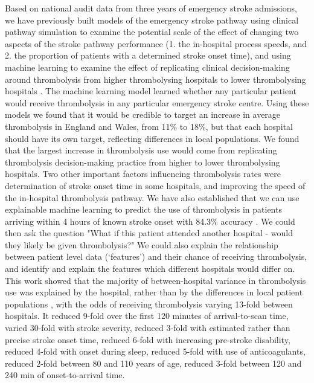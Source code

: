 Based on national audit data from three years of emergency stroke admissions, we have previously built models of the emergency stroke pathway using clinical pathway simulation to examine the potential scale of the effect of changing two aspects of the stroke pathway performance (1. the in-hospital process speeds, and 2. the proportion of patients with a determined stroke onset time), and using machine learning to examine the effect of replicating clinical decision-making around thrombolysis from higher thrombolysing hospitals to lower thrombolysing hospitals \cite{allen_using_2022, allen_use_2022, pearn_what_2023}. The machine learning model learned whether any particular patient would receive thrombolysis in any particular emergency stroke centre. Using these models we found that it would be credible to target an increase in average thrombolysis in England and Wales, from 11\% to 18\%, but that each hospital should have its own target, reflecting differences in local populations. We found that the largest increase in thrombolysis use would come from replicating thrombolysis decision-making practice from higher to lower thrombolysing hospitals. Two other important factors influencing thrombolysis rates were determination of stroke onset time in some hospitals, and improving the speed of the in-hospital thrombolysis pathway.
We have also established that we can use explainable machine learning to predict the use of thrombolysis in patients arriving within 4 hours of known stroke onset with 84.3\% accuracy \cite{pearn_what_2023}. We could then ask the question "What if this patient attended another hospital - would they likely be given thrombolysis?" We could also explain the relationship between patient level data (`features') and their chance of receiving thrombolysis, and identify and explain the features which different hospitals would differ on. This work showed that the majority of between-hospital variance in thrombolysis use was explained by the hospital, rather than by the differences in local patient populations \cite{pearn_what_2023}, with the odds of receiving thrombolysis varying 13-fold between hospitals. It reduced 9-fold over the first 120 minutes of arrival-to-scan time, varied 30-fold with stroke severity, reduced 3-fold with estimated rather than precise stroke onset time, reduced 6-fold with increasing pre-stroke disability, reduced 4-fold with onset during sleep, reduced 5-fold with use of anticoagulants, reduced 2-fold between 80 and 110 years of age, reduced 3-fold between 120 and 240 min of onset-to-arrival time.

